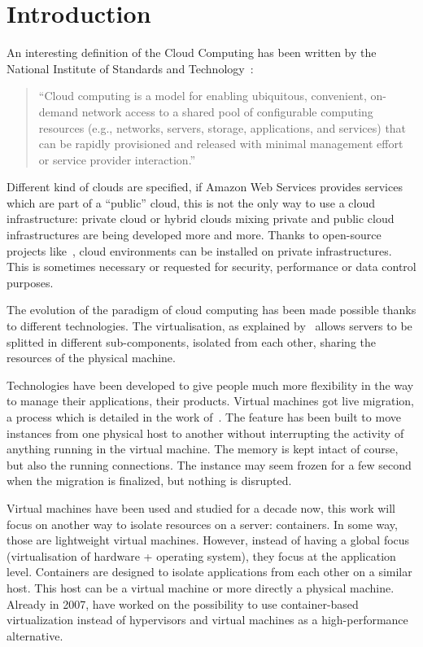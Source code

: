 \section*{Introduction}

An interesting definition of the Cloud Computing has
been written by the National Institute of Standards and Technology~\citep*{nistcloudcomputing}:

\begin{quote}
	“Cloud computing is a model for enabling ubiquitous, convenient, on-demand
	network access to a shared pool of configurable computing resources (e.g.,
	networks, servers, storage, applications, and services) that can be rapidly
	provisioned and released with minimal management effort or service provider
	interaction.”
\end{quote}

Different kind of clouds are specified, if Amazon Web Services provides
services which are part of a “public” cloud, this is not the only way to use a
cloud infrastructure: private cloud or hybrid clouds mixing private and public
cloud infrastructures are being developed more and more. Thanks to open-source
projects like~\cite{websiteOpenstack}, cloud environments can be installed on
private infrastructures. This is sometimes necessary or requested for security,
performance or data control purposes.

The evolution of the paradigm of cloud computing has been made possible thanks
to different technologies. The virtualisation, as explained
by~\cite*{virtualisation} allows servers to be splitted in different
sub-components, isolated from each other, sharing the resources of the physical
machine.

Technologies have been developed to give people much more flexibility in the
way to manage their applications, their products. Virtual machines got live
migration, a process which is detailed in the work of~\cite*{livemigration}.
The feature has been built to move instances from one physical host to another without
interrupting the activity of anything running in the virtual machine. The
memory is kept intact of course, but also the running connections. The instance
may seem frozen for a few second when the migration is finalized, but nothing
is disrupted.

Virtual machines have been used and studied for a decade now, this work will focus
on another way to isolate resources on a server: containers. In some way, those are
lightweight virtual machines. However, instead of having a global focus (virtualisation
of hardware + operating system), they focus at the application level. Containers
are designed to isolate applications from each other on a similar host. This host
can be a virtual machine or more directly a physical machine. Already in 2007,
\cite{containersAsAlternative} have worked on the possibility to use container-based
virtualization instead of hypervisors and virtual machines as a high-performance
alternative.

